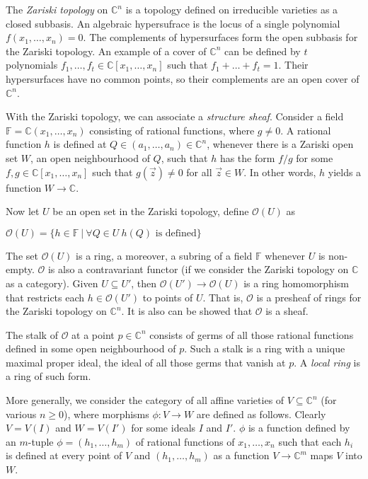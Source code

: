 \documentclass[a4paper]{article}
\theoremstyle{defin}
\theoremstyle{theorem}
\theoremstyle{claim}
\theoremstyle{prop}
\theoremstyle{lemma}
\theoremstyle{fact}
\theoremstyle{ex}
\theoremstyle{col}
\begin{document}
The \emph{Zariski topology} on $\mathbb{C}^n$ is a topology defined on irreducible varieties as a closed subbasis. An algebraic hypersufrace is the locus of a single polynomial $f(x_1, \dots, x_n) = 0$. The complements of hypersurfaces form the open subbasis for the Zariski topology. An example of a cover of $\mathbb{C}^n$ can be defined by $t$ polynomials $f_1, \dots, f_t \in \mathbb{C}[x_1, \dots, x_n]$ such that $f_1 + \dots + f_t = 1$. Their hypersurfaces have no common points, so their complements are an open cover of $\mathbb{C}^n$.

With the Zariski topology, we can associate a \emph{structure sheaf}. Consider a field $\mathbb{F} = \mathbb{C}(x_1, \dots, x_n)$ consisting of rational functions, where $g \neq 0$. A rational function $h$ is defined at $Q \in (a_1, \dots, a_n) \in \mathbb{C}^n$, whenever there is a Zariski open set $W$, an open neighbourhood of $Q$, such that $h$ has the form $f/g$ for some $f, g \in \mathbb{C}[x_1, \dots, x_n]$ such that $g(\vec{z}) \neq 0$ for all $\vec{z} \in W$. In other words, $h$ yields a function $W \to \mathbb{C}$.

Now let $U$ be an open set in the Zariski topology, define $\mathcal{O}(U)$ as
\begin{center}
$\mathcal{O}(U) = \{ h \in \mathbb{F} \: | \: \forall Q \in U \: \text{$h(Q)$ is defined} \}$
\end{center}
The set $\mathcal{O}(U)$ is a ring, a moreover, a subring of a field $\mathbb{F}$ whenever $U$ is non-empty. $\mathcal{O}$ is also a contravariant functor (if we consider the Zariski topology on $\mathbb{C}$ as a category). Given $U \subseteq U'$, then $\mathcal{O}(U') \to \mathcal{O}(U)$ is a ring homomorphism that restricts each $h \in \mathcal{O}(U')$ to points of $U$. That is, $\mathcal{O}$ is a presheaf of rings for the Zariski topology on $\mathbb{C}^n$. It is also can be showed that $\mathcal{O}$ is a sheaf.

The stalk of $\mathcal{O}$ at a point $p \in \mathbb{C}^n$ consists of germs of all those rational functions defined in some open neighbourhood of $p$. Such a stalk is a ring with a unique maximal proper ideal, the ideal of all those germs that vanish at $p$. A \emph{local ring} is a ring of such form.

More generally, we consider the category of all affine varieties of $V \subseteq \mathbb{C}^n$ (for various $n \geq 0$), where morphisms $\phi : V \to W$ are defined as follows. Clearly $V = V(I)$ and $W = V(I')$ for some ideals $I$ and $I'$. $\phi$ is a function defined by an $m$-tuple $\phi = (h_1, \dots, h_m)$ of rational functions of $x_1, \dots, x_n$ such that each $h_i$ is defined at every point of $V$ and $(h_1, \dots, h_m)$ as a function $V \to \mathbb{C}^m$ maps $V$ into $W$.
\end{document}
